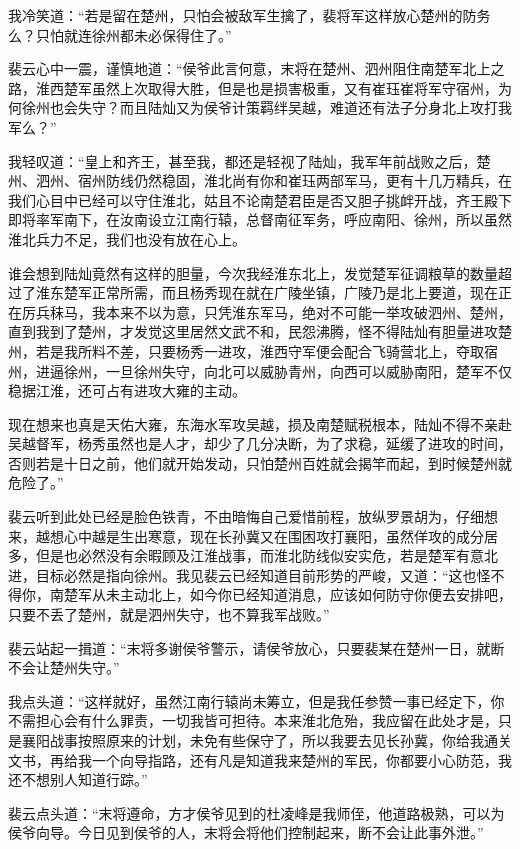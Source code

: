 我冷笑道：“若是留在楚州，只怕会被敌军生擒了，裴将军这样放心楚州的防务么？只怕就连徐州都未必保得住了。”

裴云心中一震，谨慎地道：“侯爷此言何意，末将在楚州、泗州阻住南楚军北上之路，淮西楚军虽然上次取得大胜，但是也是损害极重，又有崔珏崔将军守宿州，为何徐州也会失守？而且陆灿又为侯爷计策羁绊吴越，难道还有法子分身北上攻打我军么？”

我轻叹道：“皇上和齐王，甚至我，都还是轻视了陆灿，我军年前战败之后，楚州、泗州、宿州防线仍然稳固，淮北尚有你和崔珏两部军马，更有十几万精兵，在我们心目中已经可以守住淮北，姑且不论南楚君臣是否又胆子挑衅开战，齐王殿下即将率军南下，在汝南设立江南行辕，总督南征军务，呼应南阳、徐州，所以虽然淮北兵力不足，我们也没有放在心上。

谁会想到陆灿竟然有这样的胆量，今次我经淮东北上，发觉楚军征调粮草的数量超过了淮东楚军正常所需，而且杨秀现在就在广陵坐镇，广陵乃是北上要道，现在正在厉兵秣马，我本来不以为意，只凭淮东军马，绝对不可能一举攻破泗州、楚州，直到我到了楚州，才发觉这里居然文武不和，民怨沸腾，怪不得陆灿有胆量进攻楚州，若是我所料不差，只要杨秀一进攻，淮西守军便会配合飞骑营北上，夺取宿州，进逼徐州，一旦徐州失守，向北可以威胁青州，向西可以威胁南阳，楚军不仅稳据江淮，还可占有进攻大雍的主动。

现在想来也真是天佑大雍，东海水军攻吴越，损及南楚赋税根本，陆灿不得不亲赴吴越督军，杨秀虽然也是人才，却少了几分决断，为了求稳，延缓了进攻的时间，否则若是十日之前，他们就开始发动，只怕楚州百姓就会揭竿而起，到时候楚州就危险了。”

裴云听到此处已经是脸色铁青，不由暗悔自己爱惜前程，放纵罗景胡为，仔细想来，越想心中越是生出寒意，现在长孙冀又在围困攻打襄阳，虽然佯攻的成分居多，但是也必然没有余暇顾及江淮战事，而淮北防线似安实危，若是楚军有意北进，目标必然是指向徐州。我见裴云已经知道目前形势的严峻，又道：“这也怪不得你，南楚军从未主动北上，如今你已经知道消息，应该如何防守你便去安排吧，只要不丢了楚州，就是泗州失守，也不算我军战败。”

裴云站起一揖道：“末将多谢侯爷警示，请侯爷放心，只要裴某在楚州一日，就断不会让楚州失守。”

我点头道：“这样就好，虽然江南行辕尚未筹立，但是我任参赞一事已经定下，你不需担心会有什么罪责，一切我皆可担待。本来淮北危殆，我应留在此处才是，只是襄阳战事按照原来的计划，未免有些保守了，所以我要去见长孙冀，你给我通关文书，再给我一个向导指路，还有凡是知道我来楚州的军民，你都要小心防范，我还不想别人知道行踪。”

裴云点头道：“末将遵命，方才侯爷见到的杜凌峰是我师侄，他道路极熟，可以为侯爷向导。今日见到侯爷的人，末将会将他们控制起来，断不会让此事外泄。”

